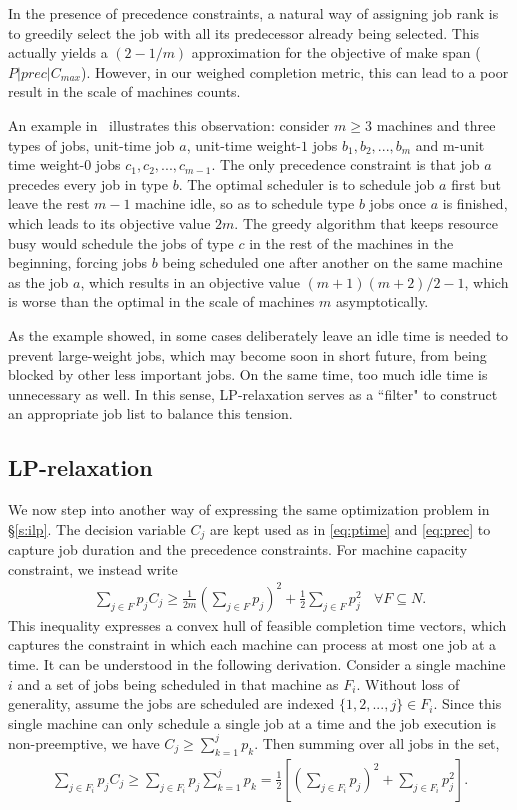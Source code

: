 In the presence of precedence constraints, a natural way of assigning job rank is to greedily select the job with all its predecessor already being selected. This actually yields a $(2-1/m)$ approximation for the objective of make span ($P|prec|C_{max}$). However, in our weighed completion metric, this can lead to a poor result in the scale of machines counts. 

An example in~\cite{queyranne2006approximation} illustrates this observation: consider $m\geq 3$ machines and three types of jobs, unit-time job $a$, unit-time weight-$1$ jobs $b_1, b_2, ..., b_m$ and m-unit time weight-0 jobs $c_1, c_2, ..., c_{m-1}$. The only precedence constraint is that job $a$ precedes every job in type $b$. The optimal scheduler is to schedule job $a$ first but leave the rest $m-1$ machine idle, so as to schedule type $b$ jobs once $a$ is finished, which leads to its objective value $2m$. The greedy algorithm that keeps resource busy would schedule the jobs of type $c$ in the rest of the machines in the beginning, forcing jobs $b$ being scheduled one after another on the same machine as the job $a$, which results in an objective value $(m+1)(m+2)/2 -1$, which is worse than the optimal in the scale of machines $m$ asymptotically.

As the example showed, in some cases deliberately leave an idle time is needed to prevent large-weight jobs, which may become soon in short future, from being blocked by other less important jobs. On the same time, too much idle time is unnecessary as well. In this sense, LP-relaxation serves as a ``filter" to construct an appropriate job list to balance this tension. 

\subsection{LP-relaxation} \label{s:lprd}
We now step into another way of expressing the same optimization problem in \S\ref{s:ilp}. The decision variable $C_j$ are kept used as in \eqref{eq:ptime} and \eqref{eq:prec} to capture job duration and the precedence constraints. For machine capacity constraint, we instead write
\begin{align}
\sum_{j\in F} p_j C_j \geq \frac{1}{2m}\left(\sum_{j\in F} p_j \right)^2 + \frac{1}{2}\sum_{j\in F}p_j^2 \:\:\:\: \forall F \subseteq N. \label{eq:mac}
\end{align}
This inequality expresses a convex hull of feasible completion time vectors, which captures the constraint in which each machine can process at most one job at a time. It can be understood in the following derivation. Consider a single machine $i$ and a set of jobs being scheduled in that machine as $F_i$. Without loss of generality, assume the jobs are scheduled are indexed $\{1,2,...,j\} \in F_i$. Since this single machine can only schedule a single job at a time and the job execution is non-preemptive, we have $C_j \geq \sum_{k=1}^j p_k$. Then summing over all jobs in the set, 
\begin{align}
\sum_{j\in F_i} p_j C_j \geq \sum_{j\in F_i} p_j \sum_{k=1}^j p_k = \frac{1}{2} \left[ \left(\sum_{j\in F_i} p_j\right)^2 + \sum_{j\in F_i}p_j^2\right]. \label{eq:ch}
\end{align}

